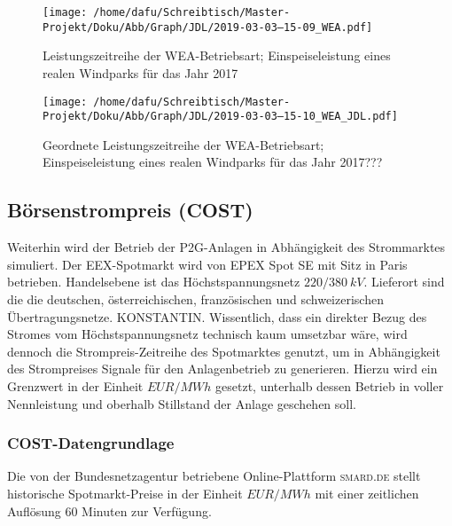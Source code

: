 \documentclass[onecolumn,10pt,titlepage]{article}
\begin{document}
\begin{figure}[H]
	\centering
	\begin{minipage}[t]{0.49\textwidth}
		\texttt{[image: /home/dafu/Schreibtisch/Master-Projekt/Doku/Abb/Graph/JDL/2019-03-03--15-09\_WEA.pdf]}

		\caption[Leistungszeitreihe der WEA-Betriebsart]{Leistungszeitreihe der WEA-Betriebsart; Einspeiseleistung eines realen Windparks für das Jahr 2017}
		\label{fig:WEA_roh_betrART}
	\end{minipage}
	\hfill
	\begin{minipage}[t]{0.49\textwidth}
		\texttt{[image: /home/dafu/Schreibtisch/Master-Projekt/Doku/Abb/Graph/JDL/2019-03-03--15-10\_WEA\_JDL.pdf]}
		\caption[Geortnete Leistungszeitreihe der WEA-Betriebsart]{Geordnete Leistungszeitreihe der WEA-Betriebsart; Einspeiseleistung eines realen Windparks für das Jahr 2017???}
		\label{fig:WEA_JDL_betrART}
	\end{minipage}
\end{figure}

\subsection{Börsenstrompreis (COST)}
Weiterhin wird der Betrieb der P2G-Anlagen in Abhängigkeit des Strommarktes simuliert. Der \textsc{EEX}-Spotmarkt wird von \textsc{EPEX} Spot SE mit Sitz in Paris betrieben. Handelsebene ist das Höchstspannungsnetz $220/380~kV$. Lieferort sind die die deutschen, österreichischen, französischen und schweizerischen Übertragungsnetze. KONSTANTIN.  Wissentlich, dass ein direkter Bezug des Stromes vom Höchstspannungsnetz technisch kaum umsetzbar wäre, wird dennoch die Strompreis-Zeitreihe des Spotmarktes genutzt, um in Abhängigkeit des Strompreises Signale für den Anlagenbetrieb zu generieren. Hierzu wird ein Grenzwert in der Einheit $EUR/MWh$ gesetzt, unterhalb dessen Betrieb in voller Nennleistung und oberhalb Stillstand der Anlage geschehen soll.
\subsubsection{COST-Datengrundlage}
Die von der Bundesnetzagentur betriebene Online-Plattform \textsc{smard.de} \cite{Bundesnetzagentur.31.Januar2019} stellt historische Spotmarkt-Preise in der Einheit $EUR/MWh$ mit einer zeitlichen Auflösung 60 Minuten zur Verfügung.
\end{document}
